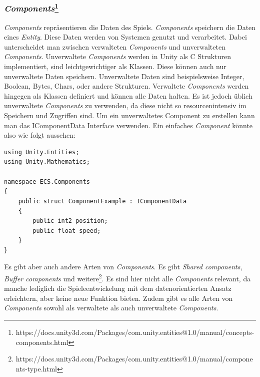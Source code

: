 \documentclass[12pt, titlepage]{article}
\DeclareRobustCommand{\#}{\adjustbox{valign=B,totalheight=.57\baselineskip}{\oldhash}}%
\begin{document}
\subsubsection{\textit{Components}\footnote{https://docs.unity3d.com/Packages/com.unity.entities@1.0/manual/concepts-components.html}}
\textit{Components} repräsentieren die Daten des Spiels. \textit{Components} speichern die Daten eines \textit{Entity}. Diese Daten werden von Systemen genutzt und verarbeitet. Dabei unterscheidet man zwischen verwalteten \textit{Components} und unverwalteten \textit{Components}. Unverwaltete \textit{Components} werden in Unity als C\# Strukturen implementiert, sind leichtgewichtiger als Klassen. Diese können auch nur unverwaltete Daten speichern. Unverwaltete Daten sind beispielsweise Integer, Boolean, Bytes, Chars, oder andere Strukturen. Verwaltete \textit{Components} werden hingegen als Klassen definiert und können alle Daten halten. Es ist jedoch üblich unverwaltete \textit{Components} zu verwenden, da diese nicht so resourcenintensiv im Speichern und Zugriffen sind. Um ein unverwaltetes Component zu erstellen kann man das IComponentData Interface verwenden. Ein einfaches \textit{Component} könnte also wie folgt aussehen:
\begin{lstlisting}[style=code, caption={Beispiel unverwaltetes \textit{Component}}]
using Unity.Entities;
using Unity.Mathematics;

namespace ECS.Components
{
    public struct ComponentExample : IComponentData
    {
        public int2 position;
        public float speed;
    }
}
\end{lstlisting}
Es gibt aber auch andere Arten von \textit{Components}. Es gibt \textit{Shared components}, \textit{Buffer components} und weitere\footnote{https://docs.unity3d.com/Packages/com.unity.entities@1.0/manual/components-type.html}. Es sind hier nicht alle \textit{Components} relevant, da manche lediglich die Spieleentwickelung mit dem datenorientierten Ansatz erleichtern, aber keine neue Funktion bieten. Zudem gibt es alle Arten von \textit{Components} sowohl als verwaltete als auch unverwaltete \textit{Components}.\\
\end{document}
